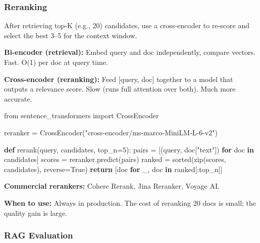 \documentclass[11pt]{article}
\newenvironment{Shaded}{\begin{snugshade}}{\end{snugshade}}
\newcommand{\BuiltInTok}[1]{\textcolor[rgb]{0.50,0.55,0.55}{#1}}
\newcommand{\ControlFlowTok}[1]{\textcolor[rgb]{0.99,0.74,0.29}{\textbf{#1}}}
\newcommand{\DecValTok}[1]{\textcolor[rgb]{0.96,0.45,0.00}{#1}}
\newcommand{\ImportTok}[1]{\textcolor[rgb]{0.15,0.68,0.38}{#1}}
\newcommand{\KeywordTok}[1]{\textcolor[rgb]{0.81,0.81,0.76}{\textbf{#1}}}
\newcommand{\NormalTok}[1]{\textcolor[rgb]{0.81,0.81,0.76}{#1}}
\newcommand{\OperatorTok}[1]{\textcolor[rgb]{0.81,0.81,0.76}{#1}}
\newcommand{\StringTok}[1]{\textcolor[rgb]{0.96,0.31,0.31}{#1}}
\newcommand{\VariableTok}[1]{\textcolor[rgb]{0.15,0.68,0.68}{#1}}
\begin{document}
\subsubsection{Reranking}\label{reranking}

After retrieving top-K (e.g., 20) candidates, use a cross-encoder to re-score and select the best 3--5 for the context window.

\textbf{Bi-encoder (retrieval):} Embed query and doc independently, compare vectors. Fast. O(1) per doc at query time.

\textbf{Cross-encoder (reranking):} Feed {[}query, doc{]} together to a model that outputs a relevance score. Slow (runs full attention over both). Much more accurate.


\begin{Shaded}
\begin{Highlighting}[]
\ImportTok{from}\NormalTok{ sentence\_transformers }\ImportTok{import}\NormalTok{ CrossEncoder}

\NormalTok{reranker }\OperatorTok{=}\NormalTok{ CrossEncoder(}\StringTok{"cross{-}encoder/ms{-}marco{-}MiniLM{-}L{-}6{-}v2"}\NormalTok{)}

\KeywordTok{def}\NormalTok{ rerank(query, candidates, top\_n}\OperatorTok{=}\DecValTok{5}\NormalTok{):}
\NormalTok{    pairs }\OperatorTok{=}\NormalTok{ [(query, doc[}\StringTok{"text"}\NormalTok{]) }\ControlFlowTok{for}\NormalTok{ doc }\KeywordTok{in}\NormalTok{ candidates]}
\NormalTok{    scores }\OperatorTok{=}\NormalTok{ reranker.predict(pairs)}
\NormalTok{    ranked }\OperatorTok{=} \BuiltInTok{sorted}\NormalTok{(}\BuiltInTok{zip}\NormalTok{(scores, candidates), reverse}\OperatorTok{=}\VariableTok{True}\NormalTok{)}
    \ControlFlowTok{return}\NormalTok{ [doc }\ControlFlowTok{for}\NormalTok{ \_, doc }\KeywordTok{in}\NormalTok{ ranked[:top\_n]]}
\end{Highlighting}
\end{Shaded}

\textbf{Commercial rerankers:} Cohere Rerank, Jina Reranker, Voyage AI.

\textbf{When to use:} Always in production. The cost of reranking 20 docs is small; the quality gain is large.

\subsubsection{RAG Evaluation}\label{rag-evaluation}
\end{document}
